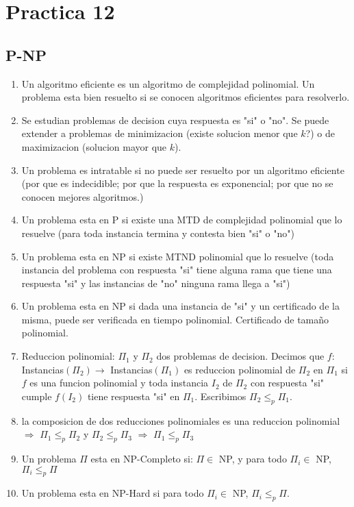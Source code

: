 \section{Practica 12}
\subsection{P-NP}
\begin{enumerate}
\item Un algoritmo eficiente es un algoritmo de complejidad polinomial. Un problema esta bien resuelto si se conocen algoritmos eficientes para resolverlo.
\item Se estudian problemas de decision cuya respuesta es "si" o "no". Se puede extender a problemas de minimizacion (existe solucion menor que $k$?) o de maximizacion (solucion mayor que $k$).
\item Un problema es intratable si no puede ser resuelto por un algoritmo eficiente (por que es indecidible; por que la respuesta es exponencial; por que no se conocen mejores algoritmos.)
\item Un problema esta en P si existe una MTD de complejidad polinomial que lo resuelve (para toda instancia termina y contesta bien "si" o "no")
\item Un problema esta en NP si existe MTND polinomial que lo resuelve (toda instancia del problema con respuesta "si" tiene alguna rama que tiene una respuesta "si" y las instancias de "no" ninguna rama llega a "si")
\item Un problema esta en NP si dada una instancia de "si" y un certificado de la misma, puede ser verificada en tiempo polinomial. Certificado de tamaño polinomial.
\item Reduccion polinomial: $\Pi_{1}$ y $\Pi_{2}$ dos problemas de decision. Decimos que $f:$ Instancias$(\Pi_{2}) \rightarrow$ Instancias$(\Pi_{1})$ es reduccion polinomial de $\Pi_{2}$ en $\Pi_{1}$ si $f$ es una funcion polinomial y toda instancia $I_{2}$ de $\Pi_{2}$ con respuesta "si" cumple $f(I_{2})$ tiene respuesta "si" en $\Pi_{1}$. Escribimos $\Pi_{2} \leq_{p} \Pi_{1}$.
\item la composicion de dos reducciones polinomiales es una reduccion polinomial $\Rightarrow$ $\Pi_{1} \leq_{p} \Pi_{2}$ y $\Pi_{2} \leq_{p} \Pi_{3}$ $\Rightarrow$ $\Pi_{1} \leq_{p} \Pi_{3}$
\item Un problema $\Pi$ esta en NP-Completo si: $\Pi \in$ NP, y para todo $\Pi_{i} \in$ NP, $\Pi_{i} \leq_{p} \Pi$
\item Un problema esta en NP-Hard si para todo $\Pi_{i} \in$ NP, $\Pi_{i} \leq_{p} \Pi$.

\end{enumerate}

